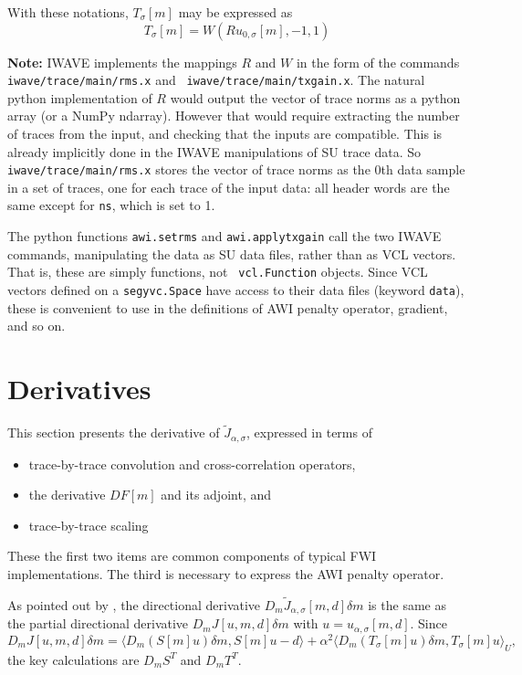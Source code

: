 With these notations, $T_{\sigma}[m]$ may be expressed as
\begin{equation}
  \label{eqn:talt}
  T_{\sigma}[m] = W(Ru_{0,\sigma}[m],-1, 1)
\end{equation}

{\bf Note:} IWAVE implements the mappings $R$ and $W$ in the form of
the commands {\tt iwave/trace/main/rms.x} and {\tt
  iwave/trace/main/txgain.x}. The natural python implementation of $R$
would output the vector of trace norms as a python array (or a NumPy
ndarray). However that would require extracting the number of traces
from the input, and checking that the inputs are compatible. This is
already implicitly done in the IWAVE manipulations of SU trace
data. So {\tt iwave/trace/main/rms.x} stores the vector of trace norms
as the 0th data sample in a set of traces, one for each trace of the
input data: all header words are the same except for {\tt ns}, which
is set to 1.

The python functions {\tt awi.setrms} and {\tt awi.applytxgain} call
the two IWAVE commands, manipulating the data as SU data files, rather
than as VCL vectors. That is, these are simply functions, not {\tt
  vcl.Function} objects. Since VCL vectors defined on a {\tt segyvc.Space}
have access to their data files (keyword {\tt data}), these is
convenient to use in the definitions of AWI penalty operator,
gradient, and so on.


\section{Derivatives}
This section presents the derivative of $\tilde{J}_{\alpha,\sigma}$, expressed in terms of
\begin{itemize}
  \item trace-by-trace convolution and cross-correlation operators,
  \item the derivative $DF[m]$ and its adjoint, and
  \item trace-by-trace scaling
\end{itemize}
These the first two items are common components of typical FWI implementations. The
third is necessary to express the AWI penalty operator.

As pointed out by \cite{GolubPereyra:73}, the directional derivative $D_m\tilde{J}_{\alpha,\sigma}[m,d]\delta m$ is the same as the partial directional derivative $D_mJ[u,m,d]\delta m$ with $u = u_{\alpha,\sigma}[m,d]$. Since 
\begin{equation}
D_mJ[u,m,d]\delta m = \langle D_m(S[m]u)\delta m, S[m]u-d \rangle + \alpha^2 \langle D_m(T_{\sigma}[m]u)\delta m,T_{\sigma}[m]u\rangle_U,
\label{eqn:basederiv}
\end{equation}
the key calculations are $D_mS^T$ and $D_m T^T$. 

